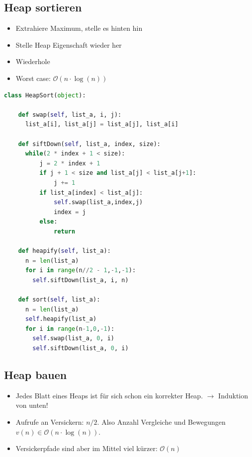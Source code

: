 \begin{sectionbox}
\subsection{Heap sortieren}\smallskip
\begin{itemize}
    \item Extrahiere Maximum, stelle es hinten hin
    \item Stelle Heap Eigenschaft wieder her
    \item Wiederhole
    \item Worst case: $\mathcal{O}(n \cdot \operatorname{log}(n))$
\end{itemize}

\begin{lstlisting}[language=Python]
class HeapSort(object):

    def swap(self, list_a, i, j):
      list_a[i], list_a[j] = list_a[j], list_a[i]

    def siftDown(self, list_a, index, size):
      while(2 * index + 1 < size):
          j = 2 * index + 1
          if j + 1 < size and list_a[j] < list_a[j+1]:
              j += 1
          if list_a[index] < list_a[j]:
              self.swap(list_a,index,j)
              index = j
          else:
              return

    def heapify(self, list_a):
      n = len(list_a)
      for i in range(n//2 - 1,-1,-1):
        self.siftDown(list_a, i, n)

    def sort(self, list_a):
      n = len(list_a)
      self.heapify(list_a)
      for i in range(n-1,0,-1):
        self.swap(list_a, 0, i)
        self.siftDown(list_a, 0, i)
\end{lstlisting}\vspace{-4px}
\end{sectionbox}

\begin{sectionbox}
\subsection{Heap bauen}\smallskip
\begin{itemize}
    \item Jedes Blatt eines Heaps ist für sich schon ein korrekter Heap. $\rightarrow$ Induktion von unten!
    \item Aufrufe an Versickern: $n/2$. Also Anzahl Vergleiche und Bewegungen $v(n) \in \mathcal{O}(n \cdot \operatorname{log}(n))$.
    \item Versickerpfade sind aber im Mittel viel kürzer: $\mathcal{O}(n)$
\end{itemize}
\end{sectionbox}